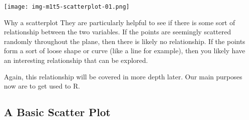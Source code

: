 \documentclass[11pt]{amsart}
\renewcommand{\(}{\left(}
\renewcommand{\)}{\right)}
\newenvironment{notes}{%
	\begin{description}[style=nextline]%
		\setlength{\itemsep}{10pt}%
		\setlength{\parskip}{2pt}%
	}
        {
	\end{description}
}
\begin{document}
\begin{notes}
	\texttt{[image: img-m1t5-scatterplot-01.png]}	
	  	
\item[Why a scatterplot]
	They are particularly helpful to see if there is some sort of relationship between the two variables.  If the points are seemingly scattered randomly throughout the plane, then there is likely no relationship.  If the points form a sort of loose shape or curve (like a line for example), then you likely have an interesting relationship that can be explored.
	
	Again, this relationship will be covered in more depth later. Our main purposes now are to get used to R.
	
\end{notes}

\subsection{A Basic Scatter Plot}
 
\end{document}
